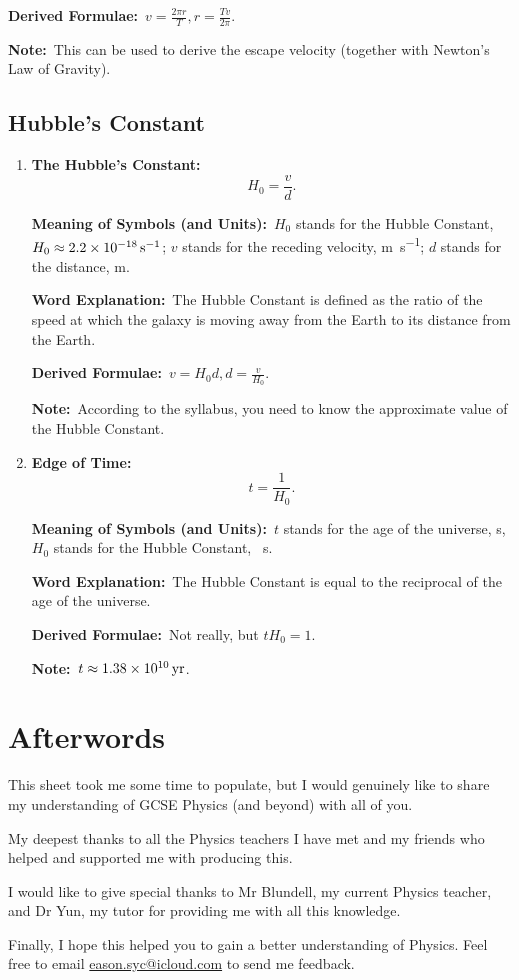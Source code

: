 \documentclass[8pt]{article}
\newcommand{\MeanSymb}{\textbf{Meaning of Symbols (and Units):}\ }
\newcommand{\WordExpl}{\textbf{Word Explanation:}\ }
\newcommand{\DeriForm}{\textbf{Derived Formulae:}\ }
\newcommand{\Note}{\textbf{Note:}\ }
\begin{document}
            \DeriForm \(v = \frac{2\pi r}{T}, r = \frac{Tv}{2\pi}\).

            \Note This can be used to derive the escape velocity (together with Newton's Law of Gravity).

        \subsection{Hubble's Constant}
            \begin{enumerate}
                \item \textbf{The Hubble's Constant:}
                \[
                    H_0 = \frac{v}{d}.
                \]

                \MeanSymb \(H_0\) stands for the Hubble Constant, \(H_0 \approx \qty{2.2 e -18}{\per \second}\); \(v\) stands for the receding velocity, \unit{\metre\per\second}; \(d\) stands for the distance, \unit{\metre}.

                \WordExpl The Hubble Constant is defined as the ratio of the speed at which the galaxy is moving away from the Earth to its distance from the Earth.

                \DeriForm \(v = H_0 d, d = \frac{v}{H_0}\).

                \Note According to the syllabus, you need to know the approximate value of the Hubble Constant.

                \item \textbf{Edge of Time:}
                \[
                    t = \frac{1}{H_0}.
                \]

                \MeanSymb \(t\) stands for the age of the universe, \unit{\second}, \(H_0\) stands for the Hubble Constant, \unit{\per\second}.

                \WordExpl The Hubble Constant is equal to the reciprocal of the age of the universe.

                \DeriForm Not really, but \(t H_0 = 1\).

                \Note \(t \approx \qty{1.38 e 10}{\mathrm{yr}}\).
            \end{enumerate}

    \section*{Afterwords}
        This sheet took me some time to populate, but I would genuinely like to share my understanding of GCSE Physics (and beyond) with all of you.
        
        My deepest thanks to all the Physics teachers I have met and my friends who helped and supported me with producing this.
        
        I would like to give special thanks to Mr Blundell, my current Physics teacher, and Dr Yun, my tutor for providing me with all this knowledge.

        Finally, I hope this helped you to gain a better understanding of Physics. Feel free to email \href{eason.syc@icloud.com}{eason.syc@icloud.com} to send me feedback.
\end{document}

